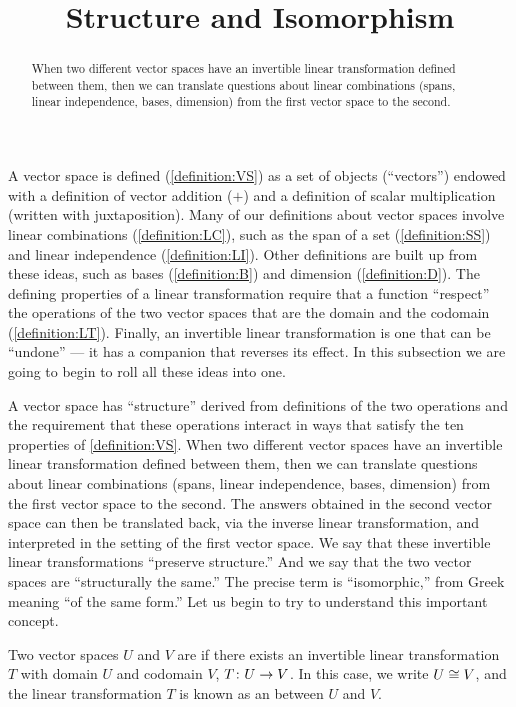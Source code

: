\documentclass{ximera}
\title{Structure and Isomorphism}
\begin{document}
\begin{abstract}
  When two different vector spaces have an invertible linear
  transformation defined between them, then we can translate questions
  about linear combinations (spans, linear independence, bases,
  dimension) from the first vector space to the second.
\end{abstract}
\maketitle

A vector space is defined (\ref{definition:VS}) as a set of objects (``vectors'') endowed with a definition of vector addition ($+$) and a definition of scalar multiplication (written with juxtaposition).  Many of our definitions about vector spaces involve linear combinations (\ref{definition:LC}), such as the span of a set (\ref{definition:SS}) and linear independence (\ref{definition:LI}).  Other definitions are built up from these ideas, such as bases (\ref{definition:B}) and dimension (\ref{definition:D}).  The defining properties of a linear transformation require that a function ``respect'' the operations of the two vector spaces that are the domain and the codomain (\ref{definition:LT}).  Finally, an invertible linear transformation is one that can be ``undone'' --- it has a companion that reverses its effect.  In this subsection we are going to begin to roll all these ideas into one.



A vector space has ``structure'' derived from definitions of the two operations and the requirement that these operations interact in ways that satisfy the ten properties of \ref{definition:VS}.  When two different vector spaces have an invertible linear transformation defined between them, then we can translate questions about linear combinations (spans, linear independence, bases, dimension) from the first vector space to the second.  The answers obtained in the second vector space can then be translated back, via the inverse linear transformation, and interpreted in the setting of the first vector space.  We say that these invertible linear transformations ``preserve structure.''  And we say that the two vector spaces are ``structurally the same.''  The precise term is ``isomorphic,'' from Greek meaning ``of the same form.''  Let us begin to try to understand this important concept.



\begin{definition}

Two vector spaces $U$ and $V$ are  if there exists an invertible linear transformation $T$ with domain $U$ and codomain $V$, $T\colon U\rightarrow V$.  In this case, we write $U\cong V$, and the linear transformation $T$ is known as an  between $U$ and $V$.


\end{definition}
\end{document}
